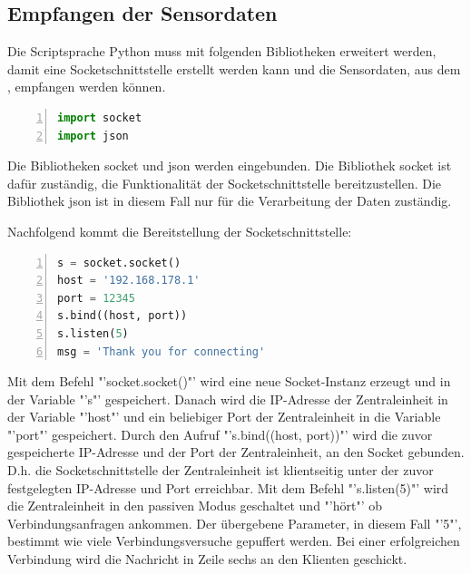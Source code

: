 \subsection{Empfangen der Sensordaten}
Die Scriptsprache Python muss mit folgenden Bibliotheken erweitert werden, damit eine Socketschnittstelle erstellt werden kann und die Sensordaten, aus dem , empfangen werden können.
\begin{lstlisting}[caption=Einbinden der Bibliotheken für die Schnittstelle,frame=single,numbers=left,language=Python]
import socket
import json
\end{lstlisting}
Die Bibliotheken socket und json werden eingebunden. Die Bibliothek socket ist dafür zuständig, die Funktionalität der Socketschnittstelle bereitzustellen. Die Bibliothek json ist in diesem Fall nur für die Verarbeitung der Daten zuständig.

Nachfolgend kommt die Bereitstellung der Socketschnittstelle:
\begin{lstlisting}[caption=Bereitstellen der Socketschnittstelle,frame=single,numbers=left,language=Python,showstringspaces=false]
s = socket.socket()
host = '192.168.178.1'
port = 12345
s.bind((host, port))
s.listen(5)
msg = 'Thank you for connecting'
\end{lstlisting}
Mit dem Befehl "'socket.socket()"' wird eine neue Socket-Instanz erzeugt und in der Variable "'s"' gespeichert. Danach wird die IP-Adresse der Zentraleinheit in der Variable "'host"' und ein beliebiger Port der Zentraleinheit in die Variable "'port"' gespeichert. Durch den Aufruf "'s.bind((host, port))"' wird die zuvor gespeicherte IP-Adresse und der Port der Zentraleinheit, an den Socket gebunden. D.h. die Socketschnittstelle der Zentraleinheit ist klientseitig unter der zuvor festgelegten IP-Adresse und Port erreichbar. Mit dem Befehl "'s.listen(5)"' wird die Zentraleinheit in den passiven Modus geschaltet und "'hört"' ob Verbindungsanfragen ankommen. Der übergebene Parameter, in diesem Fall "'5"', bestimmt wie viele Verbindungsversuche gepuffert werden. Bei einer erfolgreichen Verbindung wird die Nachricht in Zeile sechs an den Klienten geschickt.

